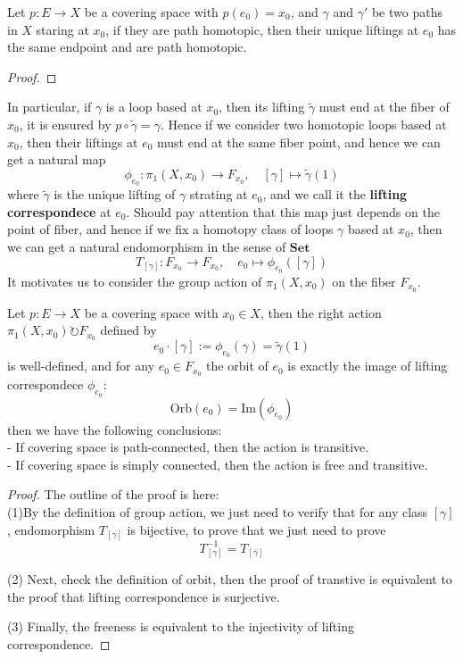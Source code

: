 \documentclass[12pt,a4paper]{article}
\begin{document}
\begin{corollary}
    Let \(p:E \to X\) be a covering space with \(p(e_0) = x_0\), and \(\gamma\) and \(\gamma'\) be two paths in \(X\) staring at \(x_0\), if they are path homotopic, then their unique liftings at \(e_0\) has the same endpoint and are path homotopic.
\end{corollary}
\begin{proof}
    
\end{proof}

In particular, if \(\gamma\) is a loop based at \(x_0\), then its lifting \(\tilde{\gamma}\) must end at the fiber of \(x_0\), it is ensured by \(p \circ \tilde{\gamma} = \gamma\). Hence if we consider two homotopic loops based at \(x_0\), then their liftings at \(e_0\) must end at the same fiber point, and hence we can get a natural map
\[\phi_{e_0}: \pi_1(X,x_0) \to F_{x_0}, \quad [\gamma] \mapsto \tilde{\gamma}(1)\]
where \(\tilde{\gamma}\) is the unique lifting of \(\gamma\) strating at \(e_0\), and we call it the \textbf{lifting correspondece} at \(e_0\). Should pay attention that this map just depends on the point of fiber, and hence if we fix a homotopy class of loops \(\gamma\) based at \(x_0\), then we can get a natural endomorphism in the sense of \(\mathbf{Set}\)
\[T_{[\gamma]}: F_{x_0} \to F_{x_0}, \quad e_0 \mapsto \phi_{e_0}([\gamma])\]
It motivates us to consider the group action of \(\pi_1(X,x_0)\) on the fiber \(F_{x_0}\).

\begin{theorem} \label{fundamentalgroupaction}
    Let \(p:E \to X\) be a covering space with \(x_0 \in X\), then the right action \(\pi_1(X,x_0) \circlearrowright F_{x_0}\) defined by
    \[e_0 \cdot [\gamma] := \phi_{e_0}(\gamma) = \tilde{\gamma}(1)\]
    is well-defined, and for any \(e_0 \in F_{x_0}\) the orbit of \(e_0\) is exactly the image of lifting correspondece \(\phi_{e_0}\):
    \[\mathrm{Orb}(e_0) = \mathrm{Im}(\phi_{e_0})\]
    then we have the following conclusions:\\

    - If covering space is path-connected, then the action is transitive.\\

    - If covering space is simply connected, then the action is free and transitive.
\end{theorem}
\begin{proof}
    The outline of the proof is here:\\

    (1)By the definition of group action, we just need to verify that for any class \([\gamma]\), endomorphism \(T_{[\gamma]}\) is bijective, to prove that we just need to prove
    \[T_[\gamma]^{-1} = T_[\bar{\gamma}] \]

    (2) Next, check the definition of orbit, then the proof of transtive is equivalent to the proof that lifting correspondence is surjective.

    (3) Finally, the freeness is equivalent to the injectivity of lifting correspondence.
\end{proof}
\end{document}
